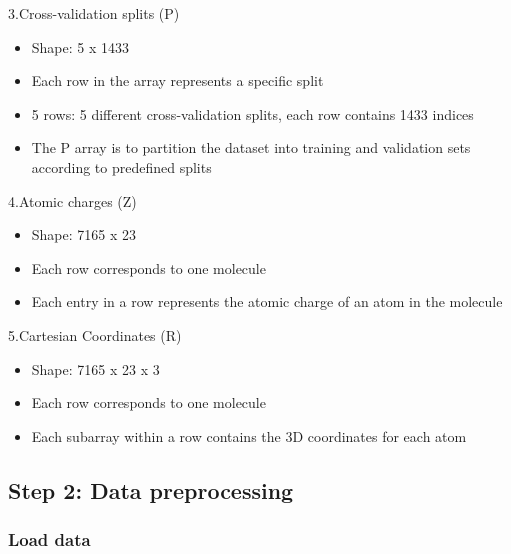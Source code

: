 \documentclass{article}
\begin{document}
3.Cross-validation splits (P)

\begin{itemize}
\item
  Shape: 5 x 1433
\item
  Each row in the array represents a specific split
\item
  5 rows: 5 different cross-validation splits, each row contains 1433
  indices
\item
  The P array is to partition the dataset into training and validation
  sets according to predefined splits
\end{itemize}

4.Atomic charges (Z)

\begin{itemize}
\item
  Shape: 7165 x 23
\item
  Each row corresponds to one molecule
\item
  Each entry in a row represents the atomic charge of an atom in the
  molecule
\end{itemize}

5.Cartesian Coordinates (R)

\begin{itemize}
\item
  Shape: 7165 x 23 x 3
\item
  Each row corresponds to one molecule
\item
  Each subarray within a row contains the 3D coordinates for each atom
\end{itemize}

\subsection{Step 2: Data preprocessing}\label{step-2-data-preprocessing}

\subsubsection{Load data}\label{load-data}

\begin{Shaded}
\begin{Highlighting}[]
 \NormalTok{):}
\NormalTok{)}
\OperatorTok{=}\NormalTok{)}
\end{Highlighting}
\end{Shaded}
\end{document}
